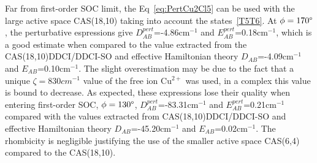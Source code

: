 \documentclass[12pt,a4paper]{report}
\numberwithin{equation}{section}
\begin{document}
Far from first-order SOC limit, the Eq~\ref{eq:PertCu2Cl5} can be used with the large active space CAS(18,10) taking into account the states~\ref{T5T6}.
At $\phi=170\degree$, the perturbative espressions give $D_{AB}^{pert}$=-4.86cm$^{-1}$ and $E_{AB}^{pert}$=0.18cm$^{-1}$, which is a good estimate when compared to the value extracted from the CAS(18,10)DDCI/DDCI-SO and effective Hamiltonian theory $D_{AB}$=-4.09cm$^{-1}$ and $E_{AB}$=0.10cm$^{-1}$.
The slight overestimation may be due to the fact that a unique $\zeta=830cm^{-1}$ value of the free ion Cu$^{2+}$ was used,\cite{dunn_spin-orbit_1961} in a complex this value is bound to decrease.
As expected, these expressions lose their quality when entering first-order SOC, $\phi=130\degree$, $D_{AB}^{pert}$=-83.31cm$^{-1}$ and $E_{AB}^{pert}$=0.21cm$^{-1}$ compared with the values extracted from CAS(18,10)DDCI/DDCI-SO and effective Hamiltonian theory $D_{AB}$=-45.20cm$^{-1}$ and $E_{AB}$=0.02cm$^{-1}$.
The rhombicity is negligible justifying the use of the smaller active space CAS(6,4) compared to the CAS(18,10).
\end{document}
